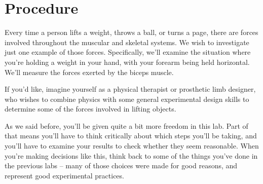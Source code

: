 \section*{Procedure}
Every time a person lifts a weight, throws a ball, or turns a page,
there are forces involved throughout the muscular and skeletal systems.
We wish to investigate just one example of those forces.
Specifically, we'll examine the situation where you're holding a weight in your
hand, with your forearm being held horizontal.
We'll measure the forces exerted by the biceps muscle.

If you'd like, imagine yourself as a 
physical therapist or prosthetic limb designer,
who wishes to combine physics with some 
general experimental design skills to determine 
some of the forces involved in lifting objects.


As we said before, you'll be given quite a bit more freedom in this lab.
Part of that means you'll have to think critically about 
which steps you'll be taking, and you'll have to examine your results to 
check whether they seem reasonable.  
When you're making decisions like this, think back to some of the things
you've done in the previous labs -- many of those choices were made 
for good reasons, and represent good experimental practices.

